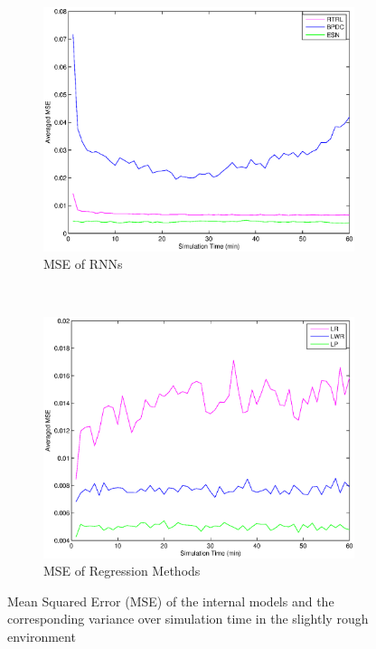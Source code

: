 \documentclass[msc,ai,logo]{infthesis}
\begin{document}
\begin{figure}[H]  
        \centering
        \begin{subfigure}[b]{0.5\textwidth}
                \centering
                \includegraphics[width=\textwidth]{RNN_05_MSE.eps}
                \caption{MSE of RNNs}
              \label{fig:RNN_05_MSE}  
        \end{subfigure}%
        ~ %
        \begin{subfigure}[b]{0.5\textwidth}
                \centering
                \includegraphics[width=\textwidth]{LR_05_MSE.eps}
                \caption{MSE of Regression Methods}
               \label{fig:LR_05_MSE}  
        \end{subfigure}
        \caption{Mean Squared Error (MSE) of the internal models and the corresponding variance over simulation time in the slightly rough environment}
         \label{fig:05_MSE}      
\end{figure}
\end{document}
